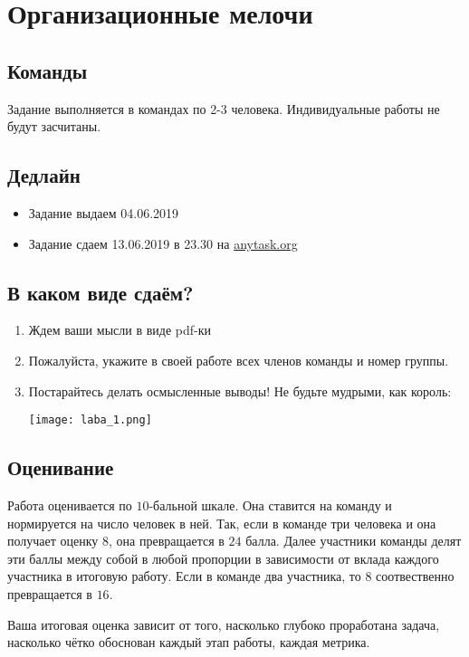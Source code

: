 \documentclass[12pt, a4paper, oneside]{article}
\begin{document}
\newpage 

\section{Организационные мелочи} 

\subsection*{Команды}

Задание  выполняется в командах по 2-3 человека. Индивидуальные работы не будут засчитаны.

\subsection*{Дедлайн}

\begin{itemize}
\item Задание выдаем 04.06.2019
\item Задание сдаем 13.06.2019 в 23.30 на \url{anytask.org}
\end{itemize} 

\subsection*{В каком виде сдаём?} 

\begin{enumerate}
	\item  Ждем ваши мысли в виде pdf-ки
	\item  Пожалуйста, укажите в своей работе всех членов команды и номер группы. 
    \item  Постарайтесь делать осмысленные выводы! Не будьте мудрыми, как король: 
		
		\begin{center}
			\texttt{[image: laba\_1.png]}
		\end{center}
	
\end{enumerate}

\subsection*{Оценивание}

Работа оценивается по $10$-бальной шкале.  Она ставится на команду и нормируется на число человек в ней. Так, если в команде три человека и она получает оценку $8$, она превращается в $24$ балла. Далее участники команды делят эти баллы между собой в любой пропорции в зависимости от вклада каждого участника в итоговую работу. Если в команде два участника, то $8$ соотвественно превращается в $16$.  

Ваша итоговая оценка зависит от того, насколько глубоко проработана задача, насколько чётко обоснован каждый этап работы, каждая метрика.  
\end{document}
